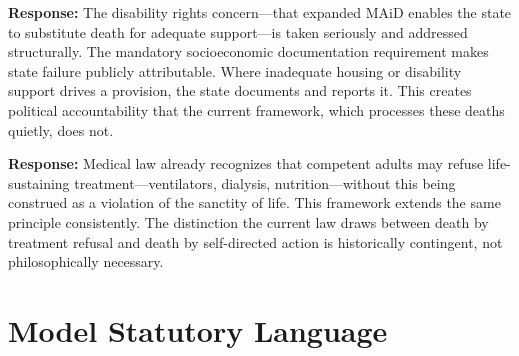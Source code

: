 \documentclass[11pt, letterpaper]{article}
\begin{document}
\medskip

\begin{objectionbox}[title={\sffamily\bfseries\small\color{C@warning}
  Objection 3: ``The disability community opposes this''}]
\textbf{Response:} The disability rights concern---that expanded MAiD enables the state
to substitute death for adequate support---is taken seriously and addressed structurally.
The mandatory socioeconomic documentation requirement makes state failure publicly
attributable. Where inadequate housing or disability support drives a provision, the
state documents and reports it. This creates political accountability that the current
framework, which processes these deaths quietly, does not.
\end{objectionbox}

\medskip

\begin{objectionbox}[title={\sffamily\bfseries\small\color{C@warning}
  Objection 4: ``It contradicts the sanctity of life''}]
\textbf{Response:} Medical law already recognizes that competent adults may refuse
life-sustaining treatment---ventilators, dialysis, nutrition---without this being
construed as a violation of the sanctity of life. This framework extends the same
principle consistently. The distinction the current law draws between death by treatment
refusal and death by self-directed action is historically contingent, not philosophically
necessary.
\end{objectionbox}

\section{Model Statutory Language}
\end{document}
